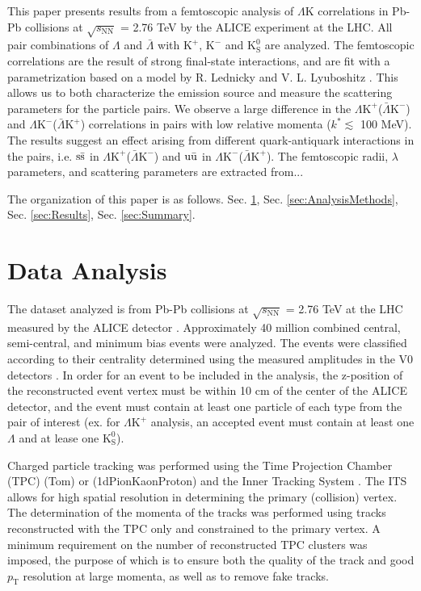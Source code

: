 \documentclass[ALICE,manyauthors]{cernphprep}
\newcommand{\kstar}{$k^{*}$\xspace}
\newcommand{\pt}{$p_{\mathrm{T}}$\xspace}
\newcommand{\Lam}{$\Lambda$\xspace}
\newcommand{\ALam}{$\bar{\Lambda}$\xspace}
\newcommand{\KchP}{$\mathrm{K^{+}}$\xspace}
\newcommand{\KchM}{$\mathrm{K^{-}}$\xspace}
\newcommand{\Ks}{$\mathrm{K^{0}_{S}}$\xspace}
\newcommand{\LamK}{$\Lambda$K\xspace}
\newcommand{\LamKchP}{$\Lambda\mathrm{K^{+}}$\xspace}
\newcommand{\LamKchPALamKchM}{$\Lambda\mathrm{K^{+}}$($\bar{\Lambda}\mathrm{K^{-}}$)\xspace}
\newcommand{\LamKchMALamKchP}{$\Lambda\mathrm{K^{-}}$($\bar{\Lambda}\mathrm{K^{+}}$)\xspace}
\begin{document}
This paper presents results from a femtoscopic analysis of \LamK correlations in Pb-Pb collisions at $\sqrt{s_{\mathrm{NN}}}$ = 2.76 TeV by the ALICE experiment at the LHC.  
All pair combinations of \Lam and \ALam with \KchP, \KchM and \Ks are analyzed. 
The femtoscopic correlations are the result of strong final-state interactions, and are fit with a parametrization based on a model by R. Lednicky and V. L. Lyuboshitz \cite{Lednicky:82}.  
This allows us to both characterize the emission source and measure the scattering parameters for the particle pairs.  
We observe a large difference in the \LamKchPALamKchM and \LamKchMALamKchP correlations in pairs with low relative momenta (\kstar $\lesssim$ 100 MeV).  
The results suggest an effect arising from different quark-antiquark interactions in the pairs, i.e. $\rm s\bar{s}$ in \LamKchPALamKchM and $\rm u\bar{u}$ in \LamKchMALamKchP.  
The femtoscopic radii, $\lambda$ parameters, and scattering parameters are extracted from...

The organization of this paper is as follows.  Sec. \ref{sec:DataAnalysis}, Sec. \ref{sec:AnalysisMethods}, Sec. \ref{sec:Results}, Sec. \ref{sec:Summary}.

\section{Data Analysis}
\label{sec:DataAnalysis}

The dataset analyzed is from Pb-Pb collisions at $\sqrt{s_{\mathrm{NN}}}$ = 2.76 TeV at the LHC measured by the ALICE detector \cite{1748-0221-3-08-S08002}.
Approximately 40 million combined central, semi-central, and minimum bias events were analyzed.
The events were classified according to their centrality determined using the measured amplitudes in the V0 detectors \cite{Abelev:2013qoq}.  
In order for an event to be included in the analysis, the z-position of the reconstructed event vertex must be within 10 cm of the center of the ALICE detector, and the event must contain at least one particle of each type from the pair of interest (ex. for \LamKchP analysis, an accepted event must contain at least one \Lam and at lease one \Ks). 

Charged particle tracking was performed using the Time Projection Chamber (TPC) \cite{2010NIMPA.622..316A} (Tom) or \cite{Dellacasa:451098} (1dPionKaonProton) and the Inner Tracking System \cite{1748-0221-3-08-S08002}.  
The ITS allows for high spatial resolution in determining the primary (collision) vertex.
The determination of the momenta of the tracks was performed using tracks reconstructed with the TPC only and constrained to the primary vertex.
A minimum requirement on the number of reconstructed TPC clusters was imposed, the purpose of which is to ensure both the quality of the track and good \pt resolution at large momenta, as well as to remove fake tracks.
\end{document}
